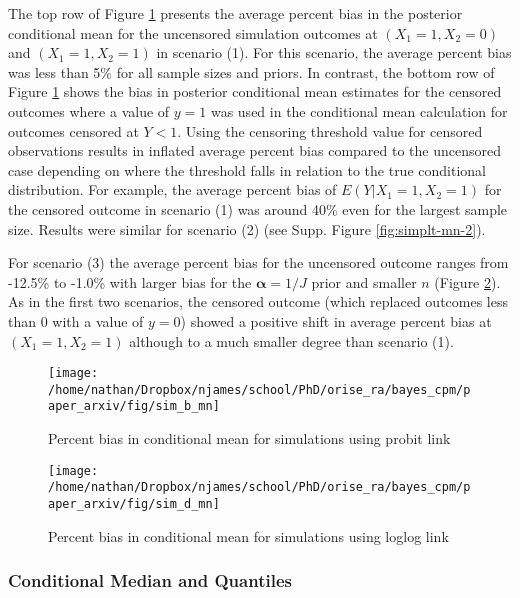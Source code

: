 \documentclass[
]{article}
\begin{document}
The top row of Figure \ref{fig:simplt-mn-1} presents the average percent bias in the posterior conditional mean for the uncensored simulation outcomes at \((X_1=1,X_2=0)\) and \((X_1=1,X_2=1)\) in scenario (1). For this scenario, the average percent bias was less than 5\% for all sample sizes and priors. In contrast, the bottom row of Figure \ref{fig:simplt-mn-1} shows the bias in posterior conditional mean estimates for the censored outcomes where a value of \(y=1\) was used in the conditional mean calculation for outcomes censored at \(Y<1\). Using the censoring threshold value for censored observations results in inflated average percent bias compared to the uncensored case depending on where the threshold falls in relation to the true conditional distribution. For example, the average percent bias of \(E(Y|X_1=1,X_2=1)\) for the censored outcome in scenario (1) was around 40\% even for the largest sample size. Results were similar for scenario (2) (see Supp. Figure \ref{fig:simplt-mn-2}).

For scenario (3) the average percent bias for the uncensored outcome ranges from -12.5\% to -1.0\% with larger bias for the \(\boldsymbol{\alpha}=1/J\) prior and smaller \(n\) (Figure \ref{fig:simplt-mn-3}). As in the first two scenarios, the censored outcome (which replaced outcomes less than 0 with a value of \(y=0\)) showed a positive shift in average percent bias at \((X_1=1,X_2=1)\) although to a much smaller degree than scenario (1).

\begin{figure}

{\centering \texttt{[image: /home/nathan/Dropbox/njames/school/PhD/orise\_ra/bayes\_cpm/paper\_arxiv/fig/sim\_b\_mn]} 

}

\caption{Percent bias in conditional mean for simulations using probit link}\label{fig:simplt-mn-1}
\end{figure}

\begin{figure}

{\centering \texttt{[image: /home/nathan/Dropbox/njames/school/PhD/orise\_ra/bayes\_cpm/paper\_arxiv/fig/sim\_d\_mn]} 

}

\caption{Percent bias in conditional mean for simulations using loglog link}\label{fig:simplt-mn-3}
\end{figure}

\hypertarget{conditional-median-and-quantiles}{%
\subsubsection{Conditional Median and Quantiles}\label{conditional-median-and-quantiles}}
\end{document}

